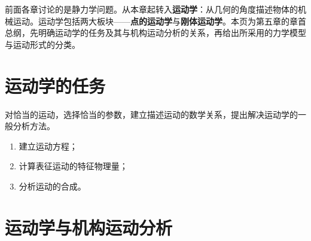 
前面各章讨论的是静力学问题。从本章起转入\textbf{运动学}：从几何的角度描述物体的机械运动。运动学包括两大板块——\textbf{点的运动学}与\textbf{刚体运动学}。本页为第五章的章首总纲，先明确运动学的任务及其与机构运动分析的关系，再给出所采用的力学模型与运动形式的分类。

\section{运动学的任务}

\begin{keybox}[运动学的任务]
对恰当的运动，选择恰当的参数，建立描述运动的数学关系，提出解决运动学的一般分析方法。
\end{keybox}


\begin{enumerate}
    \item 建立运动方程；
    \item 计算表征运动的特征物理量；
    \item 分析运动的合成。
\end{enumerate}

\section{运动学与机构运动分析}

